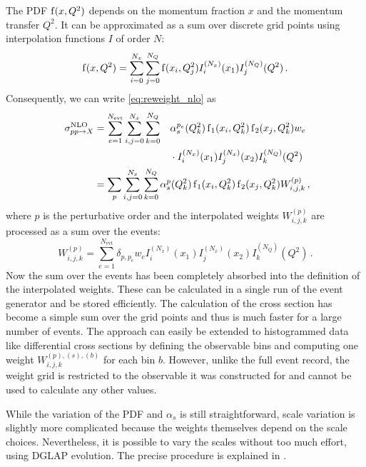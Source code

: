 The PDF $\operatorname{f}(x,Q^2)$ depends on the momentum fraction $x$ and the momentum transfer $Q^2$.
It can be approximated as a sum over discrete grid points using interpolation functions $I$ of order $N$:
%
\begin{equation}
	\operatorname{f}(x,Q^2) = \sum_{i=0}^{N_x} \sum_{j=0}^{N_Q} \operatorname{f}(x_i,Q_j^2) I_i^{(N_x)}(x_1) I_j^{(N_Q)}(Q^2) \, .
\end{equation}
%
Consequently, we can write \cref{eq:reweight_nlo} as
%
\begin{alignat}{3}
  \sigma^\text{NLO}_{pp \rightarrow X}	&= \sum_{e=1}^{N_\text{evt}} \sum_{i,j=0}^{N_x} \sum_{k=0}^{N_Q} &&\alpha_s^{p_e}(Q_k^2) \pdf_1(x_i,Q_k^2) \pdf_2(x_j,Q_k^2) w_e \nonumber \\
  										&	&&\cdot I_i^{(N_x)}(x_1) I_j^{(N_x)}(x_2) I_k^{(N_Q)}(Q^2) \nonumber \\
  										&= \mathrlap{\sum_p \sum_{i,j=0}^{N_x} \sum_{k=0}^{N_Q} \alpha_s^p(Q_k^2) \pdf_1(x_i,Q_k^2) \pdf_2(x_j,Q_k^2) W_{i,j,k}^{(p)} \, ,}
\end{alignat}
%
where $p$ is the perturbative order and the interpolated weights $W_{i,j,k}^{(p)}$ are processed as a sum over the events:
\begin{equation}
	W_{i,j,k}^{(p)} = \sum_{e=1}^{N_\text{evt}} \delta_{p,p_e} w_e I_i^{(N_x)}(x_1) I_j^{(N_x)}(x_2) I_k^{(N_Q)}(Q^2) \, .
\end{equation}
%
Now the sum over the events has been completely absorbed into the definition of the interpolated weights.
These can be calculated in a single run of the event generator and be stored efficiently.
The calculation of the cross section has become a simple sum over the grid points and thus is much faster for a large number of events.
The approach can easily be extended to histogrammed data like differential cross sections by defining the observable bins and computing one weight $W_{i,j,k}^{(p),(s),(b)}$ for each bin $b$.
However, unlike the full event record, the weight grid is restricted to the observable it was constructed for and cannot be used to calculate any other values.

While the variation of the PDF and $\alpha_s$ is still straightforward, scale variation is slightly more complicated because the weights themselves depend on the scale choices.
Nevertheless, it is possible to vary the scales without too much effort, using DGLAP evolution.
The precise procedure is explained in \cite{applgrid2010}.
%
